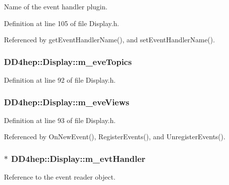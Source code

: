 Name of the event handler plugin. 

Definition at line 105 of file Display.h.

Referenced by getEventHandlerName(), and setEventHandlerName().\hypertarget{class_d_d4hep_1_1_display_a2b79f980245e444a7d9e70d09b043e07}{
\subsubsection[{m\_\-eveTopics}]{ {\bf DD4hep::Display::m\_\-eveTopics}}}
\label{class_d_d4hep_1_1_display_a2b79f980245e444a7d9e70d09b043e07}


Definition at line 92 of file Display.h.\hypertarget{class_d_d4hep_1_1_display_a5cbd62240a063355076bc617b80a7120}{
\subsubsection[{m\_\-eveViews}]{ {\bf DD4hep::Display::m\_\-eveViews}}}
\label{class_d_d4hep_1_1_display_a5cbd62240a063355076bc617b80a7120}


Definition at line 93 of file Display.h.

Referenced by OnNewEvent(), RegisterEvents(), and UnregisterEvents().\hypertarget{class_d_d4hep_1_1_display_a7b83daeea2f4100c2ce0d92d0f417ed7}{
\subsubsection[{m\_\-evtHandler}]{$\ast$ {\bf DD4hep::Display::m\_\-evtHandler}}}
\label{class_d_d4hep_1_1_display_a7b83daeea2f4100c2ce0d92d0f417ed7}


Reference to the event reader object. 

